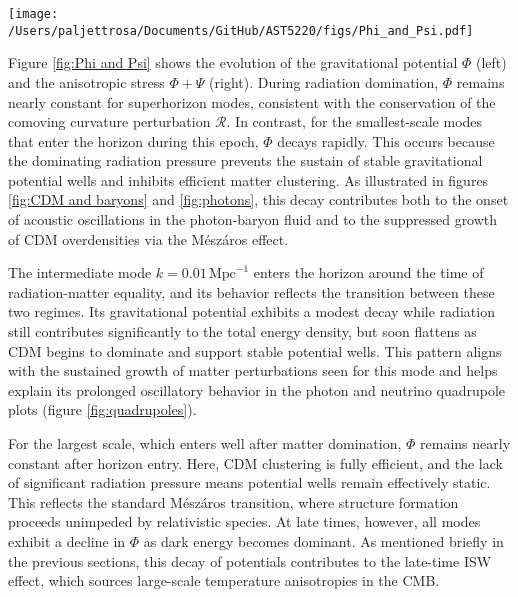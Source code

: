 \documentclass{aa}
\numberwithin{equation}{section}
\numberwithin{table}{section}
\numberwithin{figure}{section}
\begin{document}
\begin{figure*}
  \centering
  \texttt{[image: /Users/paljettrosa/Documents/GitHub/AST5220/figs/Phi\_and\_Psi.pdf]}
  \caption{Evolution of the gravitational potential $\Phi$ (left) and the anisotropic stress $\Phi + \Psi$ (right). 
  Small-scale modes that enter the horizon during radiation domination exhibit decaying $\Phi$ and oscillatory $\Phi + \Psi$, while large-scale modes preserve nearly constant potentials until dark energy domination.
  }\label{fig:Phi and Psi}
\end{figure*}

Figure \ref{fig:Phi and Psi} shows the evolution of the gravitational potential $\Phi$ (left) and the anisotropic stress $\Phi + \Psi$ (right). During radiation domination, $\Phi$ remains nearly constant for superhorizon modes, consistent with the conservation of the comoving curvature perturbation $\mathcal{R}$. In contrast, for the smallest-scale modes that enter the horizon during this epoch, $\Phi$ decays rapidly. This occurs because the dominating radiation pressure prevents the sustain of stable gravitational potential wells and inhibits efficient matter clustering. As illustrated in figures \ref{fig:CDM and baryons} and \ref{fig:photons}, this decay contributes both to the onset of acoustic oscillations in the photon-baryon fluid and to the suppressed growth of CDM overdensities via the Mészáros effect.

The intermediate mode $k = 0.01\,\text{Mpc}^{-1}$ enters the horizon around the time of radiation-matter equality, and its behavior reflects the transition between these two regimes. Its gravitational potential exhibits a modest decay while radiation still contributes significantly to the total energy density, but soon flattens as CDM begins to dominate and support stable potential wells. This pattern aligns with the sustained growth of matter perturbations seen for this mode and helps explain its prolonged oscillatory behavior in the photon and neutrino quadrupole plots (figure \ref{fig:quadrupoles}).

For the largest scale, which enters well after matter domination, $\Phi$ remains nearly constant after horizon entry. Here, CDM clustering is fully efficient, and the lack of significant radiation pressure means potential wells remain effectively static. This reflects the standard Mészáros transition, where structure formation proceeds unimpeded by relativistic species. At late times, however, all modes exhibit a decline in $\Phi$ as dark energy becomes dominant. As mentioned briefly in the previous sections, this decay of potentials contributes to the late-time ISW effect, which sources large-scale temperature anisotropies in the CMB.
\end{document}
